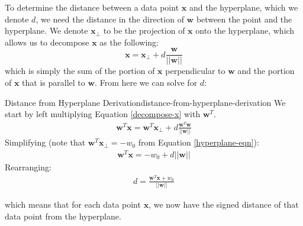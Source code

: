 To determine the distance between a data point $\textbf{x}$ and the hyperplane, which we denote $d$, we need the distance in the direction of $\textbf{w}$ between the point and the hyperplane. We denote $\textbf{x}_{\perp}$ to be the projection of $\textbf{x}$ onto the hyperplane, which allows us to decompose $\textbf{x}$ as the following:
\begin{equation} \label{decompose-x}
	\textbf{x} = \textbf{x}_{\perp} + d \frac{\textbf{w}}{|| \textbf{w} ||}
\end{equation}
which is simply the sum of the portion of $\textbf{x}$ perpendicular to $\textbf{w}$ and the portion of $\textbf{x}$ that is parallel to $\textbf{w}$. From here we can solve for $d$:
\begin{derivation}{Distance from Hyperplane Derivation}{distance-from-hyperplane-derivation}
	We start by left multiplying Equation \ref{decompose-x} with $\textbf{w}^{T}$.
	\begin{align*}
		\textbf{w}^{T}\textbf{x} = \textbf{w}^{T}\textbf{x}_{\perp} + d \frac{\textbf{w}^{T}\textbf{w}}{||\textbf{w}||}
	\end{align*}
	Simplifying (note that $\textbf{w}^{T}\textbf{x}_{\perp} = -w_{0}$ from Equation \ref{hyperplane-eqn}):
	\begin{align*}
		\textbf{w}^{T}\textbf{x} =  - w_{0} + d ||\textbf{w}||
	\end{align*}
	Rearranging:
	\begin{align*}
		d = \frac{\textbf{w}^{T}\textbf{x} + w_{0}}{||\textbf{w}||}
	\end{align*}
\end{derivation}
which means that for each data point $\textbf{x}$, we now have the signed distance of that data point from the hyperplane.

